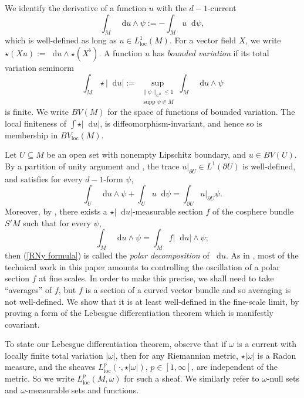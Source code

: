 \documentclass[reqno,11pt]{amsart}
\DeclareMathOperator{\supp}{supp}
\newcommand*\dif{\mathop{}\!\mathrm{d}}
\newcommand{\dfn}[1]{\emph{#1}\index{#1}}
\newcommand{\loc}{\mathrm{loc}}
\theoremstyle{definition}
\numberwithin{equation}{section}
\begin{document}
We identify the derivative of a function $u$ with the $d-1$-current
$$\int_M \dif u \wedge \psi := -\int_M u \dif \psi,$$
which is well-defined as long as $u \in L^1_\loc(M)$.
For a vector field $X$, we write $\star (Xu) := \dif u \wedge \star (X^\flat)$.
A function $u$ has \dfn{bounded variation} if its total variation seminorm
\begin{equation}\label{total variation}
\int_M \star |\dif u| := \sup_{\substack{\|\psi\|_{C^0} \leq 1\\\supp \psi \Subset M}} \int_M \dif u \wedge \psi
\end{equation}
is finite. We write $BV(M)$ for the space of functions of bounded variation.
The local finiteness of $\int \star |\dif u|$, is diffeomorphism-invariant, and hence so is membership in $BV_\loc(M)$.

Let $U \subseteq M$ be an open set with nonempty Lipschitz boundary, and $u \in BV(U)$.
By a partition of unity argument and \cite[Teorema 1]{Miranda67}, the trace $u|_{\partial U} \in L^1(\partial U)$ is well-defined,
and satisfies for every $d - 1$-form $\psi$,
\begin{equation}\label{Miranda IBP}
\int_U \dif u \wedge \psi + \int_U u \dif \psi = \int_{\partial U} u|_{\partial U} \psi.
\end{equation}
Moreover, by \cite[Theorem 4.14]{simon1983GMT}, there exists a $\star |\dif u|$-measurable section $f$ of the cosphere bundle $S'M$ such that for every $\psi$,
\begin{equation}\label{RNy formula}
\int_M \dif u \wedge \psi = \int_M f|\dif u| \wedge \psi;
\end{equation}
then (\ref{RNy formula}) is called the \dfn{polar decomposition} of $\dif u$.
As in \cite{Miranda66, Giusti77}, most of the technical work in this paper amounts to controlling the oscillation of a polar section $f$ at fine scales.
In order to make this precise, we shall need to take ``averages'' of $f$, but $f$ is a section of a curved vector bundle and so averaging is not well-defined.
We show that it is at least well-defined in the fine-scale limit, by proving a form of the Lebesgue differentiation theorem which is manifestly covariant.

To state our Lebesgue differentiation theorem, observe that if $\omega$ is a current with locally finite total variation $|\omega|$, then for any Riemannian metric, $\star|\omega|$ is a Radon measure, and the sheaves $L^p_\loc(\cdot, \star |\omega|)$, $p \in [1, \infty]$, are independent of the metric.
So we write $L^p_\loc(M, \omega)$ for such a sheaf.
We similarly refer to $\omega$-null sets and $\omega$-measurable sets and functions.
\end{document}
